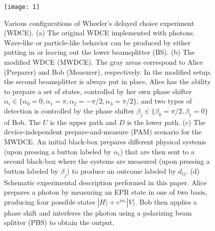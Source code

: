 \documentclass[aps,prl,twocolumn,amsmath,amssymb,nofootinbib,superscriptaddress]{revtex4-1}
\begin{document}
\begin{figure}[tb]
\texttt{[image: 1]}
\caption{Various configurations of Wheeler's delayed choice experiment (WDCE).  
(a) The original WDCE implemented with photons. Wave-like or particle-like behavior can be produced by either putting in or leaving out the lower beamsplitter (BS).  (b) The modified WDCE (MWDCE). The gray areas correspond to Alice (Preparer) and Bob (Measurer), respectively.  In the modified setup, the second beamsplitter is always put in place, Alice has the ability to prepare a set of states, controlled by her own phase shifter ${\alpha_i} \in \{ {\alpha_0} = 0,{\alpha_1} = \pi ,{\alpha_2} =  - \pi /2,{\alpha_3} = \pi /2\}$, and two types of detection is controlled by the phase shifter ${\beta _j} \in \{ {\beta _0} = \pi /2,{\beta _1} = 0\}$ of Bob. The $U$ is the upper path and $D$ is the lower path.  (c) The device-independent prepare-and-measure (PAM) scenario for the MWDCE. An initial black-box prepares different physical systems (upon pressing a button labeled by ${\alpha _i}$) that are then sent to a second black-box where the systems are measured (upon pressing a button labeled by ${\beta _j}$) to produce an outcome labeled by $d_{ij}$. (d) Schematic experimental description performed in this paper. Alice prepares a photon by measuring an EPR state in one of two basis, producing four possible states $ | H \rangle + e^{i \alpha_i} | V \rangle $.  Bob then applies a phase shift and interferes the photon using a polarizing beam splitter (PBS) to obtain the output.} \label{fig:1}
\end{figure}












\end{document}
